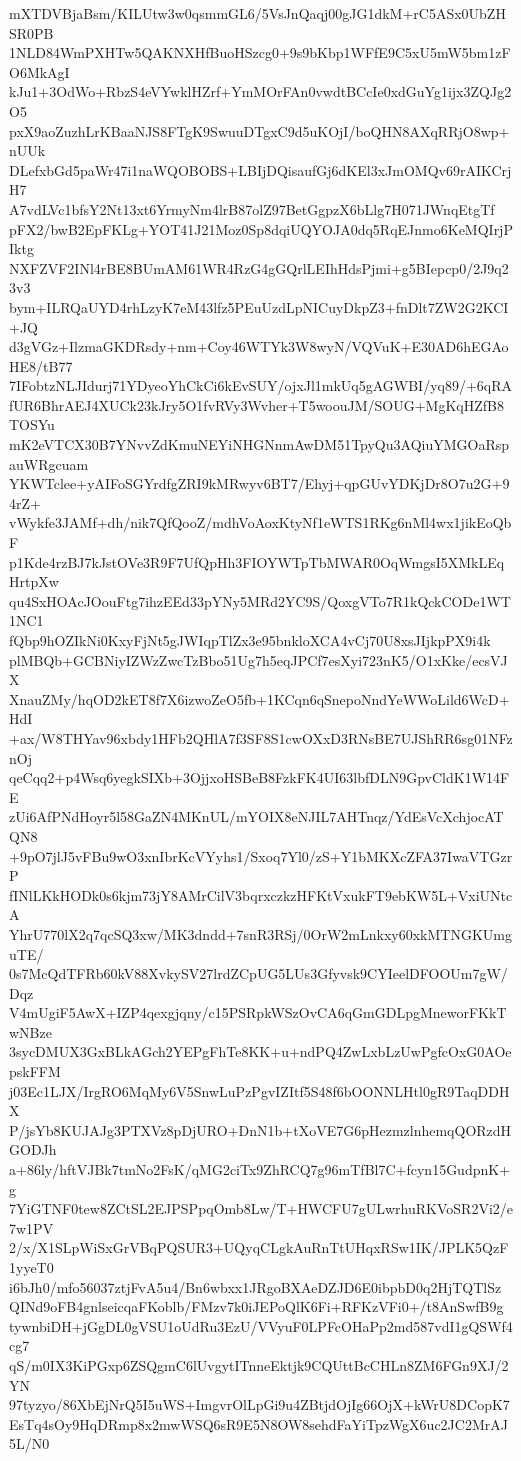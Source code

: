 mXTDVBjaBsm/KILUtw3w0qsmmGL6/5VsJnQaqj00gJG1dkM+rC5ASx0UbZHSR0PB
1NLD84WmPXHTw5QAKNXHfBuoHSzcg0+9s9bKbp1WFfE9C5xU5mW5bm1zFO6MkAgI
kJu1+3OdWo+RbzS4eVYwklHZrf+YmMOrFAn0vwdtBCcIe0xdGuYg1ijx3ZQJg2O5
pxX9aoZuzhLrKBaaNJS8FTgK9SwuuDTgxC9d5uKOjI/boQHN8AXqRRjO8wp+nUUk
DLefxbGd5paWr47i1naWQOBOBS+LBIjDQisaufGj6dKEl3xJmOMQv69rAIKCrjH7
A7vdLVc1bfsY2Nt13xt6YrmyNm4lrB87olZ97BetGgpzX6bLlg7H071JWnqEtgTf
pFX2/bwB2EpFKLg+YOT41J21Moz0Sp8dqiUQYOJA0dq5RqEJnmo6KeMQIrjPIktg
NXFZVF2INl4rBE8BUmAM61WR4RzG4gGQrlLEIhHdsPjmi+g5BIepcp0/2J9q23v3
bym+ILRQaUYD4rhLzyK7eM43lfz5PEuUzdLpNICuyDkpZ3+fnDlt7ZW2G2KCI+JQ
d3gVGz+IlzmaGKDRsdy+nm+Coy46WTYk3W8wyN/VQVuK+E30AD6hEGAoHE8/tB77
7IFobtzNLJIdurj71YDyeoYhCkCi6kEvSUY/ojxJl1mkUq5gAGWBI/yq89/+6qRA
fUR6BhrAEJ4XUCk23kJry5O1fvRVy3Wvher+T5woouJM/SOUG+MgKqHZfB8TOSYu
mK2eVTCX30B7YNvvZdKmuNEYiNHGNnmAwDM51TpyQu3AQiuYMGOaRspauWRgcuam
YKWTclee+yAIFoSGYrdfgZRI9kMRwyv6BT7/Ehyj+qpGUvYDKjDr8O7u2G+94rZ+
vWykfe3JAMf+dh/nik7QfQooZ/mdhVoAoxKtyNf1eWTS1RKg6nMl4wx1jikEoQbF
p1Kde4rzBJ7kJstOVe3R9F7UfQpHh3FIOYWTpTbMWAR0OqWmgsI5XMkLEqHrtpXw
qu4SxHOAcJOouFtg7ihzEEd33pYNy5MRd2YC9S/QoxgVTo7R1kQckCODe1WT1NC1
fQbp9hOZIkNi0KxyFjNt5gJWIqpTlZx3e95bnkloXCA4vCj70U8xsJIjkpPX9i4k
plMBQb+GCBNiyIZWzZwcTzBbo51Ug7h5eqJPCf7esXyi723nK5/O1xKke/ecsVJX
XnauZMy/hqOD2kET8f7X6izwoZeO5fb+1KCqn6qSnepoNndYeWWoLild6WcD+HdI
+ax/W8THYav96xbdy1HFb2QHlA7f3SF8S1cwOXxD3RNsBE7UJShRR6sg01NFznOj
qeCqq2+p4Wsq6yegkSIXb+3OjjxoHSBeB8FzkFK4UI63lbfDLN9GpvCldK1W14FE
zUi6AfPNdHoyr5l58GaZN4MKnUL/mYOIX8eNJIL7AHTnqz/YdEsVcXchjocATQN8
+9pO7jlJ5vFBu9wO3xnIbrKcVYyhs1/Sxoq7Yl0/zS+Y1bMKXcZFA37IwaVTGzrP
fINlLKkHODk0s6kjm73jY8AMrCilV3bqrxczkzHFKtVxukFT9ebKW5L+VxiUNtcA
YhrU770lX2q7qcSQ3xw/MK3dndd+7snR3RSj/0OrW2mLnkxy60xkMTNGKUmguTE/
0s7McQdTFRb60kV88XvkySV27lrdZCpUG5LUs3Gfyvsk9CYIeelDFOOUm7gW/Dqz
V4mUgiF5AwX+IZP4qexgjqny/c15PSRpkWSzOvCA6qGmGDLpgMneworFKkTwNBze
3sycDMUX3GxBLkAGch2YEPgFhTe8KK+u+ndPQ4ZwLxbLzUwPgfcOxG0AOepskFFM
j03Ec1LJX/IrgRO6MqMy6V5SnwLuPzPgvIZItf5S48f6bOONNLHtl0gR9TaqDDHX
P/jsYb8KUJAJg3PTXVz8pDjURO+DnN1b+tXoVE7G6pHezmzlnhemqQORzdHGODJh
a+86ly/hftVJBk7tmNo2FsK/qMG2ciTx9ZhRCQ7g96mTfBl7C+fcyn15GudpnK+g
7YiGTNF0tew8ZCtSL2EJPSPpqOmb8Lw/T+HWCFU7gULwrhuRKVoSR2Vi2/e7w1PV
2/x/X1SLpWiSxGrVBqPQSUR3+UQyqCLgkAuRnTtUHqxRSw1IK/JPLK5QzF1yyeT0
i6bJh0/mfo56037ztjFvA5u4/Bn6wbxx1JRgoBXAeDZJD6E0ibpbD0q2HjTQTlSz
QINd9oFB4gnlseicqaFKoblb/FMzv7k0iJEPoQlK6Fi+RFKzVFi0+/t8AnSwfB9g
tywnbiDH+jGgDL0gVSU1oUdRu3EzU/VVyuF0LPFcOHaPp2md587vdI1gQSWf4cg7
qS/m0IX3KiPGxp6ZSQgmC6lUvgytITnneEktjk9CQUttBcCHLn8ZM6FGn9XJ/2YN
97tyzyo/86XbEjNrQ5I5uWS+ImgvrOlLpGi9u4ZBtjdOjIg66OjX+kWrU8DCopK7
EsTq4sOy9HqDRmp8x2mwWSQ6sR9E5N8OW8sehdFaYiTpzWgX6uc2JC2MrAJ5L/N0
